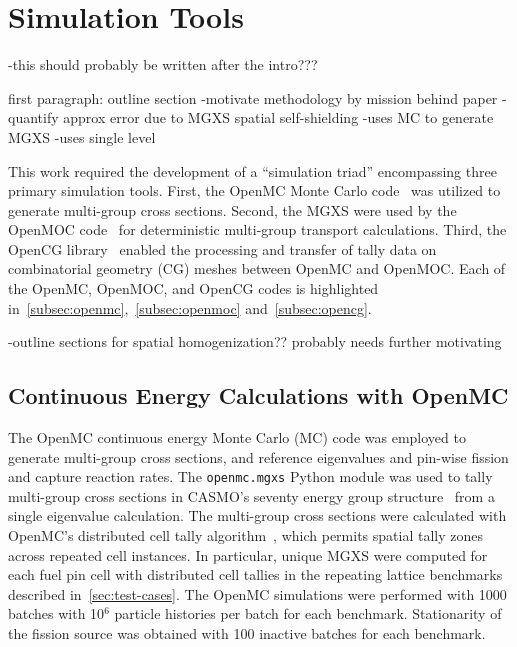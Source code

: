 \section{Simulation Tools}
\label{sec:simulation-tools}

-this should probably be written after the intro???

first paragraph: outline section
-motivate methodology by mission behind paper
  -quantify approx error due to MGXS spatial self-shielding
-uses MC to generate MGXS 
  -uses single level


This work required the development of a ``simulation triad'' encompassing three primary simulation tools. First, the OpenMC Monte Carlo code~\citep{romano2013openmc} was utilized to generate multi-group cross sections. Second, the MGXS were used by the OpenMOC code~\citep{boyd2014openmoc} for deterministic multi-group transport calculations. Third, the OpenCG library~\citep{boyd2015opencg} enabled the processing and transfer of tally data on combinatorial geometry (CG) meshes between OpenMC and OpenMOC. Each of the OpenMC, OpenMOC, and OpenCG codes is highlighted in~\autoref{subsec:openmc},~\autoref{subsec:openmoc} and~\autoref{subsec:opencg}.

-outline sections for spatial homogenization?? probably needs further motivating



\subsection{Continuous Energy Calculations with OpenMC}
\label{subsec:openmc}

The OpenMC continuous energy Monte Carlo (MC) code \citep{romano2013openmc} was employed to generate multi-group cross sections, and reference eigenvalues and pin-wise fission and capture reaction rates. The \texttt{openmc.mgxs} Python module was used to tally multi-group cross sections in CASMO's seventy energy group structure~\citep{rhodes2006casmo} from a single eigenvalue calculation. The multi-group cross sections were calculated with OpenMC's distributed cell tally algorithm~\citep{lax2014distribcell}, which permits spatial tally zones across repeated cell instances. In particular, unique MGXS were computed for each fuel pin cell with distributed cell tallies in the repeating lattice benchmarks described in~\autoref{sec:test-cases}. The OpenMC simulations were performed with 1000 batches with 10$^{6}$ particle histories per batch for each benchmark. Stationarity of the fission source was obtained with 100 inactive batches for each benchmark.

